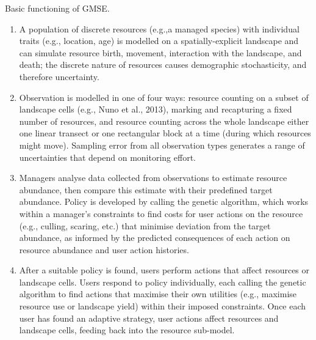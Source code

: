 \documentclass[12pt]{article}
\begin{document}
Basic functioning of GMSE.
\begin{enumerate}
                \item A population of discrete resources (e.g.,a managed species) with individual traits (e.g., location, age) is modelled on a spatially-explicit landscape and can simulate resource birth, movement, interaction with the landscape, and death; the discrete nature of resources causes demographic stochasticity, and therefore uncertainty. %
                \item Observation is modelled in one of four ways: resource counting on a subset of landscape cells (e.g., Nuno et al., 2013), marking and recapturing a fixed number of resources, and resource counting across the whole landscape either one linear transect or one rectangular block at a time (during which resources might move). Sampling error from all observation types generates a range of uncertainties that depend on monitoring effort.
                \item Managers analyse data collected from observations to estimate resource abundance, then compare this estimate with their predefined target abundance. Policy is developed by calling the genetic algorithm, which works within a manager’s constraints to find costs for user actions on the resource (e.g., culling, scaring, etc.) that minimise deviation from the target abundance, as informed by the predicted consequences of each action on resource abundance and user action histories.
                \item After a suitable policy is found, users perform actions that affect resources or landscape cells. Users respond to policy individually, each calling the genetic algorithm to find actions that maximise their own utilities (e.g., maximise resource use or landscape yield) within their imposed constraints. Once each user has found an adaptive strategy, user actions affect resources and landscape cells, feeding back into the resource sub-model.
\end{enumerate}
\end{document}
